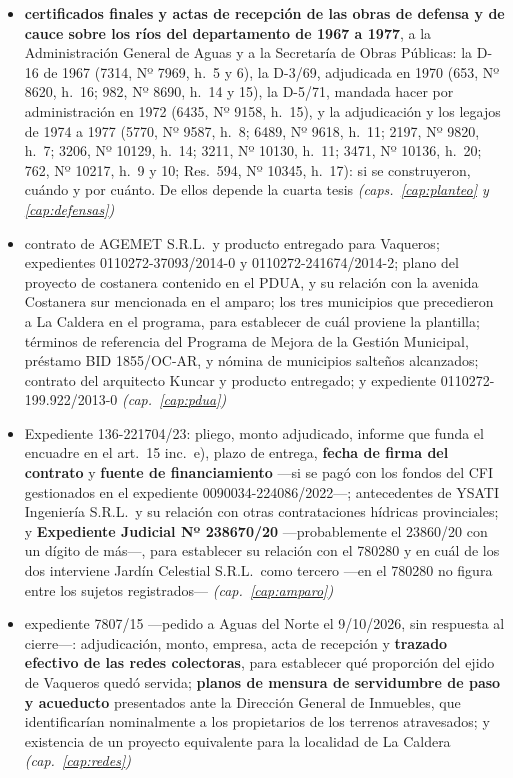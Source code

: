 \begin{itemize}[leftmargin=*]
\item \textbf{certificados finales y actas de recepción de las obras de defensa y de cauce sobre los ríos del departamento de 1967 a 1977}, a la Administración General de Aguas y a la Secretaría de Obras Públicas: la D-16 de 1967 (7314, Nº 7969, h.\ 5 y 6), la D-3/69, adjudicada en 1970 (653, Nº 8620, h.\ 16; 982, Nº 8690, h.\ 14 y 15), la D-5/71, mandada hacer por administración en 1972 (6435, Nº 9158, h.\ 15), y la adjudicación y los legajos de 1974 a 1977 (5770, Nº 9587, h.\ 8; 6489, Nº 9618, h.\ 11; 2197, Nº 9820, h.\ 7; 3206, Nº 10129, h.\ 14; 3211, Nº 10130, h.\ 11; 3471, Nº 10136, h.\ 20; 762, Nº 10217, h.\ 9 y 10; Res.\ 594, Nº 10345, h.\ 17): si se construyeron, cuándo y por cuánto. De ellos depende la cuarta tesis \textit{(caps.\ \ref{cap:planteo} y \ref{cap:defensas})}
\item contrato de AGEMET S.R.L.\ y producto entregado para Vaqueros; expedientes 0110272-37093/2014-0 y 0110272-241674/2014-2; plano del proyecto de costanera contenido en el PDUA, y su relación con la avenida Costanera sur mencionada en el amparo; los tres municipios que precedieron a La Caldera en el programa, para establecer de cuál proviene la plantilla; términos de referencia del Programa de Mejora de la Gestión Municipal, préstamo BID 1855/OC-AR, y nómina de municipios salteños alcanzados; contrato del arquitecto Kuncar y producto entregado; y expediente 0110272-199.922/2013-0 \textit{(cap.\ \ref{cap:pdua})}
\item Expediente 136-221704/23: pliego, monto adjudicado, informe que funda el encuadre en el art.\ 15 inc.\ e), plazo de entrega, \textbf{fecha de firma del contrato} y \textbf{fuente de financiamiento} ---si se pagó con los fondos del CFI gestionados en el expediente 0090034-224086/2022---; antecedentes de YSATI Ingeniería S.R.L.\ y su relación con otras contrataciones hídricas provinciales; y \textbf{Expediente Judicial Nº 238670/20} ---probablemente el 23860/20 con un dígito de más---, para establecer su relación con el 780280 y en cuál de los dos interviene Jardín Celestial S.R.L.\ como tercero ---en el 780280 no figura entre los sujetos registrados--- \textit{(cap.\ \ref{cap:amparo})}
\item expediente 7807/15 ---pedido a Aguas del Norte el 9/10/2026, sin respuesta al cierre---: adjudicación, monto, empresa, acta de recepción y \textbf{trazado efectivo de las redes colectoras}, para establecer qué proporción del ejido de Vaqueros quedó servida; \textbf{planos de mensura de servidumbre de paso y acueducto} presentados ante la Dirección General de Inmuebles, que identificarían nominalmente a los propietarios de los terrenos atravesados; y existencia de un proyecto equivalente para la localidad de La Caldera \textit{(cap.\ \ref{cap:redes})}

\end{itemize}
